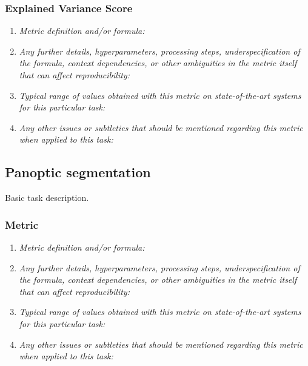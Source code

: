 \documentclass[a4paper,11pt]{article}
\begin{document}
        \subsubsection{Explained Variance Score}
            \begin{enumerate}[label=\alph*.]
                \item \textit{Metric definition and/or formula:}
                \bigskip
                \item \textit{Any further details, hyperparameters, processing steps, underspecification of the formula, context dependencies, or other ambiguities in the metric itself that can affect reproducibility:}
                \bigskip
                \item \textit{Typical range of values obtained with this metric on state-of-the-art systems for this particular task:}
                \bigskip
                \item \textit{Any other issues or subtleties that should be mentioned regarding this metric when applied to this task:}
                \bigskip
            \end{enumerate}
        

    \subsection{Panoptic segmentation}
        Basic task description.
        \subsubsection{Metric}
            \begin{enumerate}[label=\alph*.]
                \item \textit{Metric definition and/or formula:}
                \bigskip
                \item \textit{Any further details, hyperparameters, processing steps, underspecification of the formula, context dependencies, or other ambiguities in the metric itself that can affect reproducibility:}
                \bigskip
                \item \textit{Typical range of values obtained with this metric on state-of-the-art systems for this particular task:}
                \bigskip
                \item \textit{Any other issues or subtleties that should be mentioned regarding this metric when applied to this task:}
                \bigskip
            \end{enumerate}
\end{document}
